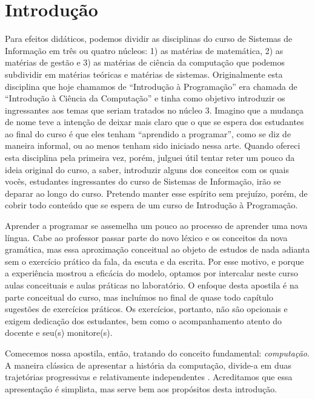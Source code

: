 \chapter{Introdução}
\label{cha:introducao}

Para efeitos didáticos, podemos dividir as disciplinas do curso de Sistemas de Informação em três ou quatro núcleos: 1) as matérias de matemática, 2) as matérias de gestão e 3) as matérias de ciência da computação que podemos subdividir em matérias teóricas e matérias de sistemas.
Originalmente esta disciplina que hoje chamamos de ``Introdução à Programação'' era chamada de ``Introdução à Ciência da Computação'' e tinha como objetivo introduzir os ingressantes aos temas que seriam tratados no núcleo 3.
Imagino que a mudança de nome teve a intenção de deixar mais claro que o que se espera dos estudantes ao final do curso é que eles tenham ``aprendido a programar'', como se diz de maneira informal, ou ao menos tenham sido iniciado nessa arte.
Quando ofereci esta disciplina pela primeira vez, porém, julguei útil tentar reter um pouco da ideia original do curso, a saber, introduzir alguns dos conceitos com os quais vocês, estudantes ingressantes do curso de Sistemas de Informação, irão se deparar ao longo do curso.
Pretendo manter esse espírito sem prejuízo, porém, de cobrir todo conteúdo que se espera de um curso de Introdução à Programação.

Aprender a programar se assemelha um pouco ao processo de aprender uma nova língua.
Cabe ao professor passar parte do novo léxico e os conceitos da nova gramática, mas essa aproximação conceitual ao objeto de estudos de nada adianta sem o exercício prático da fala, da escuta e da escrita.
Por esse motivo, e porque a experiência mostrou a eficácia do modelo, optamos por intercalar neste curso aulas conceituais e aulas práticas no laboratório.
O enfoque desta apostila é na parte conceitual do curso, mas incluímos no final de quase todo capítulo sugestões de exercícios práticos.
Os exercícios, portanto, não são opcionais e exigem dedicação dos estudantes, bem como o acompanhamento atento do docente e seu(s) monitore(s).

Comecemos nossa apostila, então, tratando do conceito fundamental: {\em computação}.
A maneira clássica de apresentar a história da computação, divide-a em duas trajetórias progressivas e relativamente independentes \cite{}.
Acreditamos que essa apresentação é simplista, mas serve bem aos propósitos desta introdução.

